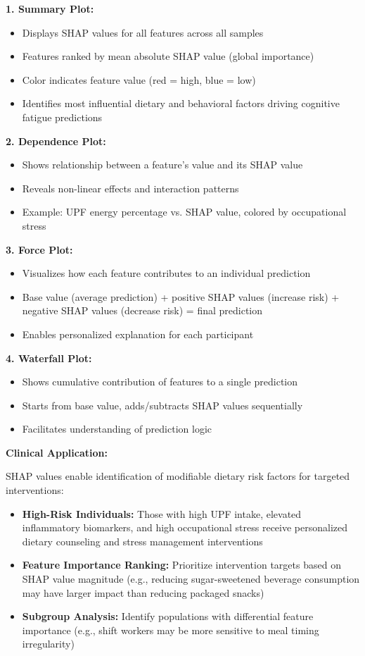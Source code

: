 \documentclass[journal,twoside,10pt]{IEEEtran}
\begin{document}
\textbf{1. Summary Plot:}
\begin{itemize}
\item Displays SHAP values for all features across all samples
\item Features ranked by mean absolute SHAP value (global importance)
\item Color indicates feature value (red = high, blue = low)
\item Identifies most influential dietary and behavioral factors driving cognitive fatigue predictions
\end{itemize}

\textbf{2. Dependence Plot:}
\begin{itemize}
\item Shows relationship between a feature's value and its SHAP value
\item Reveals non-linear effects and interaction patterns
\item Example: UPF energy percentage vs. SHAP value, colored by occupational stress
\end{itemize}

\textbf{3. Force Plot:}
\begin{itemize}
\item Visualizes how each feature contributes to an individual prediction
\item Base value (average prediction) + positive SHAP values (increase risk) + negative SHAP values (decrease risk) = final prediction
\item Enables personalized explanation for each participant
\end{itemize}

\textbf{4. Waterfall Plot:}
\begin{itemize}
\item Shows cumulative contribution of features to a single prediction
\item Starts from base value, adds/subtracts SHAP values sequentially
\item Facilitates understanding of prediction logic
\end{itemize}

\textbf{Clinical Application:}

SHAP values enable identification of modifiable dietary risk factors for targeted interventions:
\begin{itemize}
\item \textbf{High-Risk Individuals:} Those with high UPF intake, elevated inflammatory biomarkers, and high occupational stress receive personalized dietary counseling and stress management interventions
\item \textbf{Feature Importance Ranking:} Prioritize intervention targets based on SHAP value magnitude (e.g., reducing sugar-sweetened beverage consumption may have larger impact than reducing packaged snacks)
\item \textbf{Subgroup Analysis:} Identify populations with differential feature importance (e.g., shift workers may be more sensitive to meal timing irregularity)
\end{itemize}
\end{document}
